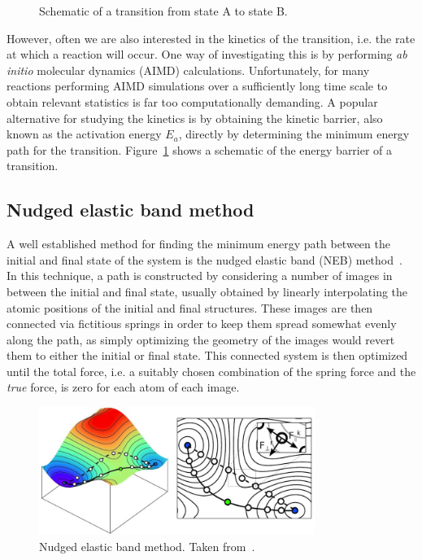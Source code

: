 \begin{refsection}
\begin{figure}[ht] 
\centering
 
\caption{\label{dft:fig-transition}Schematic of a transition from state A to state 
B.} 
\end{figure} 
 
However, often we are also interested in the kinetics of the transition, i.e. the 
rate at which a reaction will occur. One way of investigating this is by 
performing \textit{ab initio} molecular dynamics (AIMD) calculations. Unfortunately, 
for many reactions performing \gls{AIMD} simulations over a sufficiently long time 
scale to obtain relevant statistics is far too computationally demanding. A 
popular alternative for studying the kinetics is by obtaining the kinetic barrier, 
also known as the activation energy $E_a$, directly  
by determining the minimum energy path for the 
transition. Figure~\ref{dft:fig-transition} shows a schematic of the energy 
barrier of a transition. 
 
\subsection{Nudged elastic band method} \label{dft:sec-neb} 
 
A well established method for finding the minimum energy path between the 
initial and final state of the system is the nudged elastic band (\gls{NEB}) 
method~\cite{Jonsson1998, Henkelman2000}. In this technique, a path is 
constructed by considering a number of images in between the initial and final 
state, usually obtained by linearly interpolating the atomic positions of the initial and final 
structures. These images are then connected via fictitious springs in order to keep 
them spread somewhat evenly along the path, as simply optimizing the geometry 
of the images would revert them to either the initial or final state. This 
connected system is then optimized until the total force, i.e. a suitably 
chosen combination of the spring force and the \textit{true} force, is zero 
for each atom of each image.

\begin{figure}[ht] 
\centering
\includegraphics[width=0.8\textwidth]{figures/DFT/neb.jpg} 
\caption{\label{dft:fig-neb} Nudged elastic band method. Taken from~\cite{RheoMan2019}.} 
\end{figure} 


\end{refsection}
